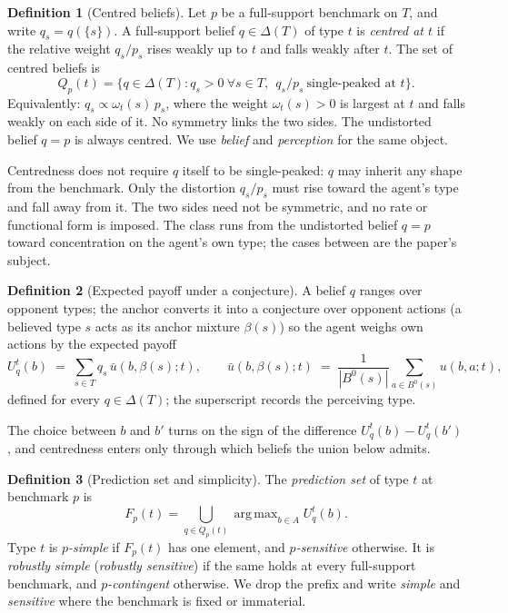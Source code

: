 \documentclass[12pt]{article}
\theoremstyle{definition}
\newtheorem{definition}{Definition}
\DeclareMathOperator*{\argmax}{arg\,max}
\begin{document}
\begin{definition}[Centred beliefs]\label{def:centred}
Let $p$ be a full-support benchmark on $T$, and write $q_s = q(\{s\})$. A full-support belief $q \in \Delta(T)$ of type $t$ is \emph{centred at $t$} if the relative weight $q_s/p_s$ rises weakly up to $t$ and falls weakly after $t$. The set of centred beliefs is
\[
Q_p(t) = \bigl\{ q \in \Delta(T) : q_s > 0 \ \forall s \in T, \ \ q_s/p_s \ \text{single-peaked at } t \bigr\}.
\]
Equivalently: $q_s \propto \omega_t(s)\, p_s$, where the weight $\omega_t(s) > 0$ is largest at $t$ and falls weakly on each side of it. No symmetry links the two sides. The undistorted belief $q = p$ is always centred. We use \emph{belief} and \emph{perception} for the same object.
\end{definition}

Centredness does not require $q$ itself to be single-peaked: $q$ may inherit any shape from the benchmark. Only the distortion $q_s/p_s$ must rise toward the agent's type and fall away from it. The two sides need not be symmetric, and no rate or functional form is imposed. The class runs from the undistorted belief $q=p$ toward concentration on the agent's own type; the cases between are the paper's subject.

\begin{definition}[Expected payoff under a conjecture]\label{def:payoff}
A belief $q$ ranges over opponent types; the anchor converts it into a conjecture over opponent actions (a believed type $s$ acts as its anchor mixture $\beta(s)$) so the agent weighs own actions by the expected payoff
\[
U^t_q(b) \;=\; \sum_{s \in T} q_s\, \bar u(b, \beta(s); t),
\qquad
\bar u(b, \beta(s); t) \;=\; \frac{1}{|B^0(s)|} \sum_{a \in B^0(s)} u(b, a; t),
\]
defined for every $q \in \Delta(T)$; the superscript records the perceiving type.
\end{definition}

The choice between $b$ and $b'$ turns on the sign of the difference $U^t_q(b) - U^t_q(b')$, and centredness enters only through which beliefs the union below admits.

\begin{definition}[Prediction set and simplicity]\label{def:predset}
The \emph{prediction set} of type $t$ at benchmark $p$ is
\[
F_p(t) = \bigcup_{q \in Q_p(t)} \argmax_{b \in A} U^t_q(b).
\]
Type $t$ is \emph{$p$-simple} if $F_p(t)$ has one element, and \emph{$p$-sensitive} otherwise. It is \emph{robustly simple} (\emph{robustly sensitive}) if the same holds at every full-support benchmark, and \emph{$p$-contingent} otherwise. We drop the prefix and write \emph{simple} and \emph{sensitive} where the benchmark is fixed or immaterial.
\end{definition}
\end{document}

